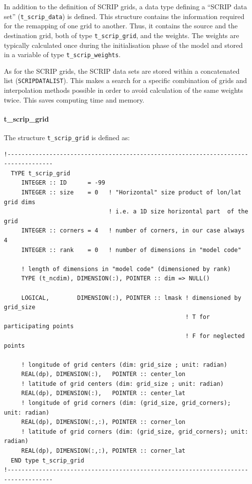 \documentclass[11pt,twoside]{article}
\begin{document}
In addition to the definition of SCRIP grids, a data type
defining a ``SCRIP data set'' (\verb|t_scrip_data|) is defined. This
structure contains the information required for the remapping 
of one grid to another. Thus, it contains the source and the destination
grid, both of type \verb|t_scrip_grid|, and the weights. The weights are
typically calculated once during the initialisation phase of the model and
stored in a variable of type \verb|t_scrip_weights|.

As for the SCRIP grids, the SCRIP data sets are stored within a
concatenated list (\verb|SCRIPDATALIST|). This makes a search for a
specific combination of 
grids and interpolation methods possible in order to avoid calculation
of the same weights twice. This saves computing time and memory.

\paragraph{\bf \rm t\_scrip\_grid\\ \label{Tsgrid}}
The structure \verb|t_scrip_grid| is defined as:
\begin{verbatim}
!-----------------------------------------------------------------------------------
  TYPE t_scrip_grid
     INTEGER :: ID      = -99
     INTEGER :: size    = 0   ! "Horizontal" size product of lon/lat grid dims 
                              ! i.e. a 1D size horizontal part  of the grid
     INTEGER :: corners = 4   ! number of corners, in our case always 4
     INTEGER :: rank    = 0   ! number of dimensions in "model code"
     
     ! length of dimensions in "model code" (dimensioned by rank)
     TYPE (t_ncdim), DIMENSION(:), POINTER :: dim => NULL()

     LOGICAL,        DIMENSION(:), POINTER :: lmask ! dimensioned by grid_size
                                                    ! T for participating points
                                                    ! F for neglected points
                                                       
     ! longitude of grid centers (dim: grid_size ; unit: radian)
     REAL(dp), DIMENSION(:),   POINTER :: center_lon 
     ! latitude of grid centers (dim: grid_size ; unit: radian)
     REAL(dp), DIMENSION(:),   POINTER :: center_lat
     ! longitude of grid corners (dim: (grid_size, grid_corners); unit: radian)
     REAL(dp), DIMENSION(:,:), POINTER :: corner_lon
     ! latitude of grid corners (dim: (grid_size, grid_corners); unit: radian)
     REAL(dp), DIMENSION(:,:), POINTER :: corner_lat
  END type t_scrip_grid
!-----------------------------------------------------------------------------------
\end{verbatim}
\end{document}
